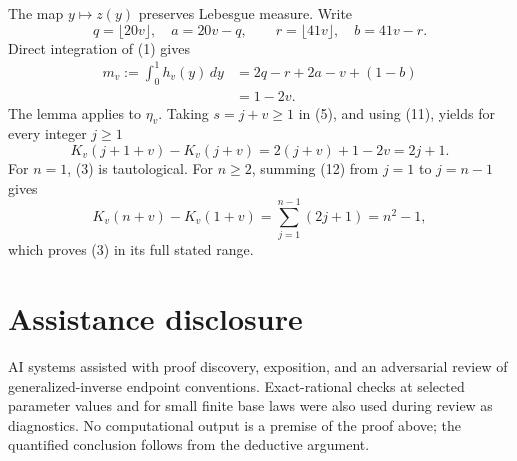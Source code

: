 \documentclass[11pt]{article}
\begin{document}
The map \(y\mapsto z(y)\) preserves Lebesgue measure.  Write
\[
 q=\lfloor20v\rfloor,\quad a=20v-q,\qquad
 r=\lfloor41v\rfloor,\quad b=41v-r.
\]
Direct integration of (1) gives
\begin{align*}
 m_v:=\int_0^1h_v(y)\,dy
   &=2q-r+2a-v+(1-b)\\
   &=1-2v.                                                       \tag{11}
\end{align*}
The lemma applies to \(\eta_v\).  Taking \(s=j+v\geq1\) in (5), and using
(11), yields for every integer \(j\geq1\)
\[
 K_v(j+1+v)-K_v(j+v)=2(j+v)+1-2v=2j+1.                         \tag{12}
\]
For \(n=1\), (3) is tautological.  For \(n\geq2\), summing (12) from
\(j=1\) to \(j=n-1\) gives
\[
 K_v(n+v)-K_v(1+v)=\sum_{j=1}^{n-1}(2j+1)=n^2-1,
\]
which proves (3) in its full stated range.

\section*{Assistance disclosure}

AI systems assisted with proof discovery, exposition, and an adversarial
review of generalized-inverse endpoint conventions.  Exact-rational checks
at selected parameter values and for small finite base laws were also used
during review as diagnostics.  No computational output is a premise of the
proof above; the quantified conclusion follows from the deductive argument.



\end{document}
